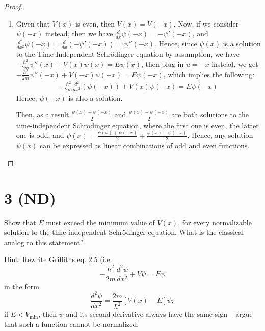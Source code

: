 \documentclass{article}
\begin{document}
\begin{proof}
\begin{enumerate}
        \hfil

        \item Given that $V(x)$ is even, then $V(x)=V(-x)$. Now, if we consider $\psi(-x)$ instead, then we have $\frac{d}{dx}\psi(-x)=-\psi'(-x)$, and $\frac{d^2}{dx^2}\psi(-x)=\frac{d}{dx}\left(-\psi'(-x)\right) = \psi''(-x)$. Hence, since $\psi(x)$ is a solution to the Time-Independent Schrödinger equation by assumption, we have $-\frac{\hbar^2}{2m}\psi''(x)+V(x)\psi(x)=E\psi(x)$, then plug in $u=-x$ instead, we get $-\frac{\hbar^2}{2m}\psi''(-x)+V(-x)\psi(-x)=E\psi(-x)$, which implies the following:
        \begin{align}
            -\frac{\hbar^2}{2m}\frac{d^2}{dx^2}(\psi(-x))+V(x)\psi(-x)=E\psi(-x)
        \end{align}
        Hence, $\psi(-x)$ is also a solution. 

        Then, as a result $\frac{\psi(x)+\psi(-x)}{2}$ and $\frac{\psi(x)-\psi(-x)}{2}$ are both solutions to the time-independent Schrödinger equation, where the first one is even, the latter one is odd, and $\psi(x)=\frac{\psi(x)+\psi(-x)}{2}+\frac{\psi(x)-\psi(-x)}{2}$. Hence, any solution $\psi(x)$ can be expressed as linear combinations of odd and even functions.
    \end{enumerate}
\end{proof}

\newpage

\section*{3  (ND)}
\begin{ques}\label{q3}
Show that $E$ must exceed the minimum value of $V(x)$, for every normalizable solution to
the time-independent Schrödinger equation. What is the classical analog to this statement?

Hint: Rewrite Griffiths eq. 2.5 (i.e.
\[
-\frac{\hbar^2}{2m}\frac{d^2\psi}{dx^2} + V\psi = E\psi
\]
in the form
\[
\frac{d^2\psi}{dx^2} = \frac{2m}{\hbar^2}[V(x) - E]\psi;
\]
if $E < V_{\min}$, then $\psi$ and its second derivative always have the same sign – argue that such
a function cannot be normalized.
\end{ques}
\end{document}
